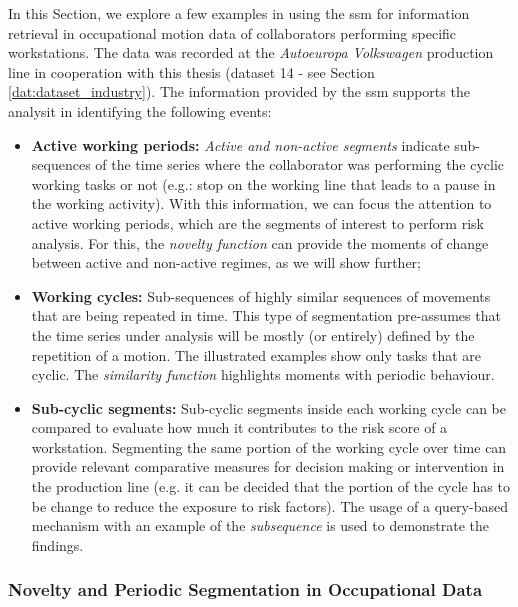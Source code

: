 In this Section, we explore a few examples in using the \gls{ssm} for information retrieval in occupational motion data of collaborators performing specific workstations. The data was recorded at the \textit{Autoeuropa Volkswagen} production line in cooperation with this thesis (dataset 14 - see Section \ref{dat:dataset_industry}). The information provided by the \gls{ssm} supports the analysit in identifying the following events: 

\begin{itemize}
\label{items:occupational_detection}
    \item \textbf{Active working periods:} \textit{Active and non-active segments} indicate sub-sequences of the time series where the collaborator was performing the cyclic working tasks or not (e.g.: stop on the working line that leads to a pause in the working activity). With this information, we can focus the attention to active working periods, which are the segments of interest to perform risk analysis. For this, the \textit{novelty function} can provide the moments of change between active and non-active regimes, as we will show further;
    
    \item \textbf{Working cycles:} Sub-sequences of highly similar sequences of movements that are being repeated in time. This type of segmentation pre-assumes that the time series under analysis will be mostly (or entirely) defined by the repetition of a motion. The illustrated examples show only tasks that are cyclic. The \textit{similarity function} highlights moments with periodic behaviour.
    
    \item \textbf{Sub-cyclic segments:} Sub-cyclic segments inside each working cycle can be compared to evaluate how much it contributes to the risk score of a workstation. Segmenting the same portion of the working cycle over time can provide relevant comparative measures for decision making or intervention in the production line (e.g. it can be decided that the portion of the cycle has to be change to reduce the exposure to risk factors). The usage of a query-based mechanism with an example of the \textit{subsequence} is used to demonstrate the findings.
\end{itemize}


\subsubsection{Novelty and Periodic Segmentation in Occupational Data}

